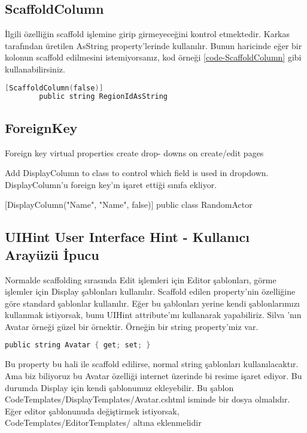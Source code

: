 \documentclass[10pt,a4paper]{article}
\begin{document}
\subsection{ScaffoldColumn }
İlgili özelliğin scaffold işlemine girip girmeyeceğini kontrol etmektedir.
Karkas tarafından üretilen AsString property'lerinde kullanılır.
Bunun haricinde eğer bir kolonun scaffold edilmesini istemiyorsanız,
kod örneği \ref{code-ScaffoldColumn} gibi kullanabilirsiniz.




\begin{lstlisting}[label=code-ScaffoldColumn,caption=ScaffoldColumn,language=C]
		[ScaffoldColumn(false)]
		public string RegionIdAsString
\end{lstlisting}


\subsection{ForeignKey  }


		
Foreign key virtual properties create drop- downs on create/edit pages

Add DisplayColumn to class to control
which field is used in dropdown. DisplayColumn'u foreign key'ın işaret ettiği sınıfa ekliyor.

[DisplayColumn("Name", "Name", false)]
public class RandomActor


\subsection{UIHint User Interface Hint - Kullanıcı Arayüzü İpucu}

Normalde scaffolding sırasında Edit işlemleri için Editor şablonları,
görme işlemler için Display şablonları kullanılır.
Scaffold edilen property'nin özelliğine göre standard şablonlar kullanılır.
Eğer bu şablonları yerine kendi şablonlarımızı kullanmak istiyorsak,
bunu UIHint attribute'ını kullanarak yapabiliriz.
Silva \cite{Silva2010}'nın Avatar örneği güzel bir örnektir.
Örneğin bir string property'miz var.

\begin{lstlisting}[label=code-UIHintOrnek1,caption=UIHint Örnek1,language=C]
	public string Avatar { get; set; }
\end{lstlisting}

Bu property bu hali ile scaffold edilirse, normal string şablonları kullanılacaktır.
Ama biz biliyoruz bu Avatar özelliği internet üzerinde bi resime işaret ediyor.
Bu durumda Display için kendi şablonumuz ekleyebilir.
Bu şablon CodeTemplates/DisplayTemplates/Avatar.cshtml isminde bir dosya olmalıdır.
Eğer editor şablonunuda değiştirmek istiyorsak,  CodeTemplates/EditorTemplates/ altına eklenmelidir
\end{document}
